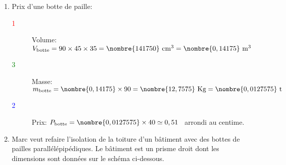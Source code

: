 \begin{enumerate}
\item Prix d'une botte de paille:
\begin{description}
\item[\textcolor{red}{1}] Volume: $V_{\text{botte}}=90\times 45\times 35=\nombre{141750}~\text{cm}^3=\nombre{0,14175}~\text{m}^3$
\item[\textcolor{green}{3}] Masse: $m_{\text{botte}}=\nombre{0,14175}\times 90=\nombre{12,7575}~\text{Kg}=\nombre{0,0127575}~\text{t}$ 
\item[\textcolor{blue}{2}] Prix: $P_{\text{botte}}=\nombre{0,0127575}\times 40\simeq 0,51$~\eurologo{} arrondi au centime.
\end{description}
\item Marc veut refaire l'isolation de la toiture d'un bâtiment avec des bottes de pailles parallélépipédiques. Le bâtiment est un prisme droit dont les dimensions sont données sur le schéma ci-dessous.


\end{enumerate}
